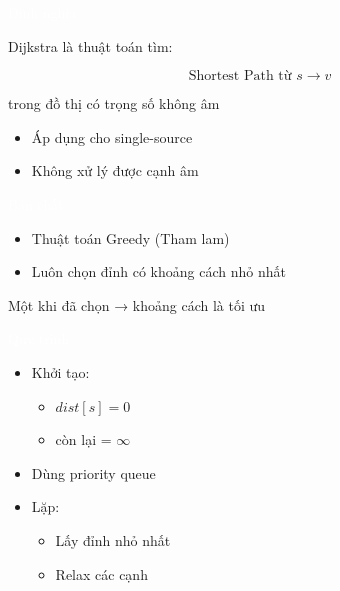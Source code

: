 \documentclass{beamer}
\title{\hlred{Dijkstra Algorithm}}
\author{Group 3}
\date{\hlcyan{03/2026}}
\newcommand{\hlblue}[1]{\textcolor{myblue}{#1}}
\newcommand{\hlgreen}[1]{\textcolor{mygreen}{#1}}
\newcommand{\hlred}[1]{\textcolor{myred}{#1}}
\newcommand{\hlpurple}[1]{\textcolor{mypurple}{#1}}
\newcommand{\hlwhite}[1]{\textcolor{white}{#1}}
\begin{document}
\frame{\titlepage}


\begin{frame}{\hlwhite{Định nghĩa}}
\begin{tcolorbox}[title=\textbf{\hlwhite{Khái niệm}}]
\hlblue{Dijkstra} là thuật toán tìm:

\[
\text{Shortest Path từ } s \rightarrow v
\]

trong đồ thị có \hlgreen{trọng số không âm}
\end{tcolorbox}

\begin{itemize}
\item Áp dụng cho \hlred{single-source}
\item Không xử lý được cạnh âm
\end{itemize}
\end{frame}


\begin{frame}{\hlwhite{Bản chất}}
\begin{itemize}
\item Thuật toán \hlblue{Greedy (Tham lam)}
\item Luôn chọn đỉnh có khoảng cách nhỏ nhất
\end{itemize}

\begin{tcolorbox}
\centering
\hlpurple{Một khi đã chọn → khoảng cách là tối ưu}
\end{tcolorbox}
\end{frame}


\begin{frame}{\hlwhite{Quy trình}}
\begin{itemize}
\item Khởi tạo:
\begin{itemize}
\item $dist[s] = 0$
\item còn lại = $\infty$
\end{itemize}

\item Dùng \hlgreen{priority queue}
\item Lặp:
\begin{itemize}
\item Lấy đỉnh nhỏ nhất
\item Relax các cạnh
\end{itemize}
\end{itemize}
\end{frame}
\end{document}
